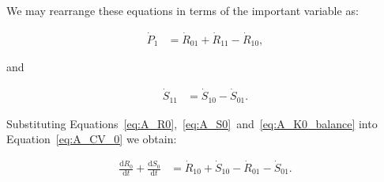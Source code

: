 We may rearrange these equations in terms of
the important variable as:

\begin{align}
\label{eq:A_P1a}
	\dot{P}_{1}												&
	= \dot{R}_{01}
	+ \dot{R}_{11}
	- \dot{R}_{10}	,
\end{align}

\noindent{}and

\begin{align}
\label{eq:A_S11}
	\dot{S}_{11}											&
	= \dot{S}_{10}
	- \dot{S}_{01}.
\end{align}

Substituting Equations~\ref{eq:A_R0},~\ref{eq:A_S0}~and~\ref{eq:A_K0_balance}
into Equation~\ref{eq:A_CV_0} we obtain:

\begin{align}\label{eq:A_CV_0a}
	\frac{\mathrm{d}R_0}{\mathrm{d}t}		
	+	\frac{\mathrm{d}S_0}{\mathrm{d}t}		&	
	=	\dot{R}_{10}		
	+	\dot{S}_{10}	
	-	\dot{R}_{01}											
	-	\dot{S}_{01}.							%
\end{align}






